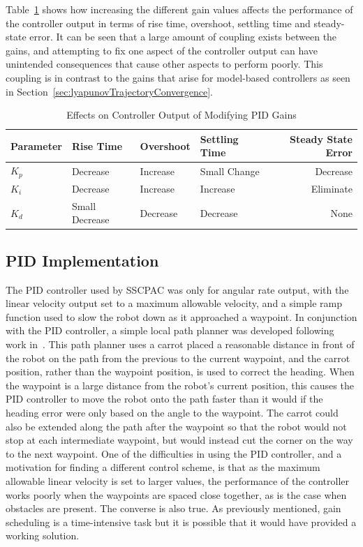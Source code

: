 Table~\ref{tab:PIDGainEffects} shows how increasing the different gain values affects the performance of the controller output in terms of rise time, overshoot, settling time and steady-state error.
It can be seen that a large amount of coupling exists between the gains,  and attempting to fix one aspect of the controller output can have unintended consequences that cause other aspects to perform poorly.
This coupling is in contrast to the gains that arise for model-based controllers as seen in Section~\ref{sec:lyapunovTrajectoryConvergence}.

\begin{table}[ht!]
\caption{Effects on Controller Output of Modifying PID Gains}
\small
\centering
\begin{tabular}{@{}llllr@{}} \toprule
Parameter    & Rise Time      & Overshoot & Settling Time & Steady State Error \\ \midrule
$K_p$        & Decrease       & Increase  & Small Change  & Decrease \\
$K_i$        & Decrease       & Increase  & Increase      & Eliminate \\
$K_d$        & Small Decrease & Decrease  & Decrease      & None \\ \bottomrule
\end{tabular}%
\label{tab:PIDGainEffects}
\end{table}

\subsection{PID Implementation}
The PID controller used by SSCPAC was only for angular rate output, with the linear velocity output set to a maximum allowable velocity, and a simple ramp function used to slow the robot down as it approached a waypoint.
In conjunction with the PID controller, a simple local path planner was developed following work in~\cite{Hogg02}.
This path planner uses a carrot placed a reasonable distance in front of the robot on the path from the previous to the current waypoint, and the carrot position, rather than the waypoint position, is used to correct the heading.
When the waypoint is a large distance from the robot's current position, this causes the PID controller to move the robot onto the path faster than it would if the heading error were only based on the angle to the waypoint.
The carrot could also be extended along the path after the waypoint so that the robot would not stop at each intermediate waypoint, but would instead cut the corner on the way to the next waypoint.
One of the difficulties in using the PID controller, and a motivation for finding a different control scheme, is that as the maximum allowable linear velocity is set to larger values, the performance of the controller works poorly when the waypoints are spaced close together, as is the case when obstacles are present.
The converse is also true.
As previously mentioned, gain scheduling is a time-intensive task but it is possible that it would have provided a working solution.

